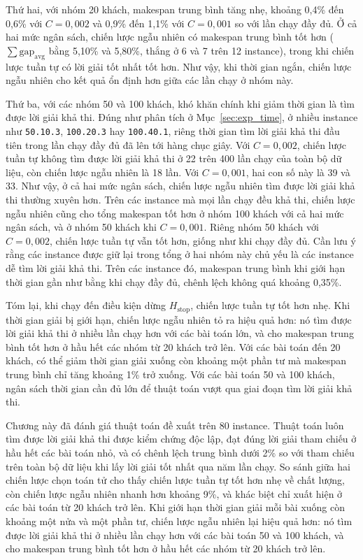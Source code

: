 \documentclass[../DoAn.tex]{subfiles}
\begin{document}
Thứ hai, với nhóm 20 khách, makespan trung bình tăng nhẹ, khoảng 0,4\% đến 0,6\% với $C = 0{,}002$ và 0,9\% đến 1,1\% với $C = 0{,}001$ so với lần chạy đầy đủ. Ở cả hai mức ngân sách, chiến lược ngẫu nhiên có makespan trung bình tốt hơn ($\sum \mathrm{gap}_{\text{avg}}$ bằng 5,10\% và 5,80\%, thắng ở 6 và 7 trên 12 instance), trong khi chiến lược tuần tự có lời giải tốt nhất tốt hơn. Như vậy, khi thời gian ngắn, chiến lược ngẫu nhiên cho kết quả ổn định hơn giữa các lần chạy ở nhóm này.

Thứ ba, với các nhóm 50 và 100 khách, khó khăn chính khi giảm thời gian là tìm được lời giải khả thi. Đúng như phân tích ở Mục~\ref{sec:exp_time}, ở nhiều instance như \texttt{50.10.3}, \texttt{100.20.3} hay \texttt{100.40.1}, riêng thời gian tìm lời giải khả thi đầu tiên trong lần chạy đầy đủ đã lên tới hàng chục giây. Với $C = 0{,}002$, chiến lược tuần tự không tìm được lời giải khả thi ở 22 trên 400 lần chạy của toàn bộ dữ liệu, còn chiến lược ngẫu nhiên là 18 lần. Với $C = 0{,}001$, hai con số này là 39 và 33. Như vậy, ở cả hai mức ngân sách, chiến lược ngẫu nhiên tìm được lời giải khả thi thường xuyên hơn. Trên các instance mà mọi lần chạy đều khả thi, chiến lược ngẫu nhiên cũng cho tổng makespan tốt hơn ở nhóm 100 khách với cả hai mức ngân sách, và ở nhóm 50 khách khi $C = 0{,}001$. Riêng nhóm 50 khách với $C = 0{,}002$, chiến lược tuần tự vẫn tốt hơn, giống như khi chạy đầy đủ. Cần lưu ý rằng các instance được giữ lại trong tổng ở hai nhóm này chủ yếu là các instance dễ tìm lời giải khả thi. Trên các instance đó, makespan trung bình khi giới hạn thời gian gần như bằng khi chạy đầy đủ, chênh lệch không quá khoảng 0,35\%.

Tóm lại, khi chạy đến điều kiện dừng $H_{\text{stop}}$, chiến lược tuần tự tốt hơn nhẹ. Khi thời gian giải bị giới hạn, chiến lược ngẫu nhiên tỏ ra hiệu quả hơn: nó tìm được lời giải khả thi ở nhiều lần chạy hơn với các bài toán lớn, và cho makespan trung bình tốt hơn ở hầu hết các nhóm từ 20 khách trở lên. Với các bài toán đến 20 khách, có thể giảm thời gian giải xuống còn khoảng một phần tư mà makespan trung bình chỉ tăng khoảng 1\% trở xuống. Với các bài toán 50 và 100 khách, ngân sách thời gian cần đủ lớn để thuật toán vượt qua giai đoạn tìm lời giải khả thi.

\bigskip
Chương này đã đánh giá thuật toán đề xuất trên 80 instance. Thuật toán luôn tìm được lời giải khả thi được kiểm chứng độc lập, đạt đúng lời giải tham chiếu ở hầu hết các bài toán nhỏ, và có chênh lệch trung bình dưới 2\% so với tham chiếu trên toàn bộ dữ liệu khi lấy lời giải tốt nhất qua năm lần chạy. So sánh giữa hai chiến lược chọn toán tử cho thấy chiến lược tuần tự tốt hơn nhẹ về chất lượng, còn chiến lược ngẫu nhiên nhanh hơn khoảng 9\%, và khác biệt chỉ xuất hiện ở các bài toán từ 20 khách trở lên. Khi giới hạn thời gian giải mỗi bài xuống còn khoảng một nửa và một phần tư, chiến lược ngẫu nhiên lại hiệu quả hơn: nó tìm được lời giải khả thi ở nhiều lần chạy hơn với các bài toán 50 và 100 khách, và cho makespan trung bình tốt hơn ở hầu hết các nhóm từ 20 khách trở lên.
\end{document}
